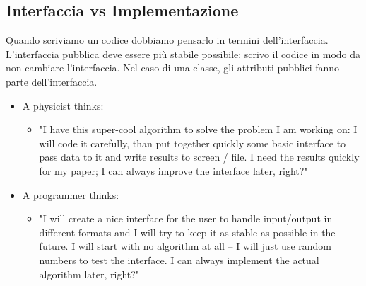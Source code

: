 \subsection{Interfaccia vs Implementazione}

Quando scriviamo un codice dobbiamo pensarlo in termini dell'interfaccia. \\ L'interfaccia pubblica deve essere più stabile possibile: scrivo il codice in modo da non cambiare l'interfaccia. Nel caso di una classe, gli attributi pubblici fanno parte dell'interfaccia.\\

  \begin{itemize}
    
    \item A physicist thinks:
        
    \medskip
      
    \begin{itemize}
      \item "I have this super-cool algorithm to solve the problem I am working on:
             I will code it carefully, than put together quickly some basic 
             interface to pass data to it and write results to screen / file.
             I need the results quickly for my paper; I can always improve the 
             interface later, right?"
    \end{itemize}
    \medskip
      
    \item A programmer thinks:
    
    \medskip
    
    \begin{itemize}
      \item "I will create a nice interface for the user to handle input/output
             in different formats and I will try to keep it as stable as 
             possible in the future.
             I will start with no algorithm at all -- I will just use random
             numbers to test the interface. I can always implement the
             actual algorithm later, right?"
    \end{itemize}

  \end{itemize}
    
